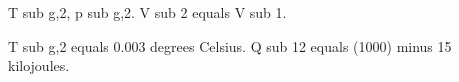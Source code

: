 T sub g,2, p sub g,2.  
V sub 2 equals V sub 1.  

T sub g,2 equals 0.003 degrees Celsius.  
Q sub 12 equals (1000) minus 15 kilojoules.
